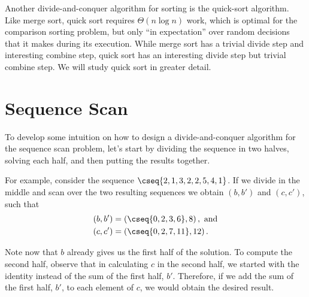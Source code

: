 \begin{remark}
Another divide-and-conquer algorithm for sorting is the quick-sort
algorithm.
% 
Like merge sort, quick sort requires $\Theta(n \log n)$ work, which
is optimal for the comparison sorting problem, but only ``in expectation'' over random decisions that it makes during its execution.
%
While merge sort has a trivial divide step and interesting combine
step, quick sort has an interesting divide step but trivial combine
step.
%
We will study quick sort in greater detail.
%
\end{remark}

\section{Sequence Scan}
\label{sec:design::dc::scan}

\begin{gram}
To develop some intuition on how to design a divide-and-conquer
algorithm for the sequence scan problem, let's start by
dividing the sequence in two halves, solving each half, and then
putting the results together. 

For example,  consider the sequence $\cseq{2,1,3,2,2,5,4,1}$.
%
If we divide in the middle and scan over the two resulting sequences
we obtain $(b,b')$ and $(c,c')$, such that 
\begin{align*}
(b, b') & = \left(\cseq{0, 2, 3, 6}, 8 \right),~\mbox{and}
\\
(c, c') & = \left(\cseq{0, 2, 7, 11}, 12\right).
\end{align*}
%

Note now that $b$ already gives us the first half of the solution.
%
To compute the second half, observe that in calculating $c$ in the
second half, we started with the identity instead of the sum of the
first half, $b'$.  
%
Therefore, if we add the sum of the first half, $b'$, to each element
of $c$, we would obtain the desired result.  
%
\end{gram}


